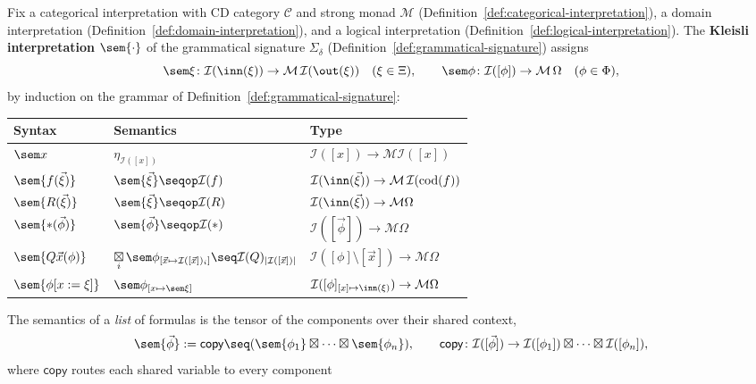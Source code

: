 \begin{definition}
\label{def:kleisli-interpretation}
\leanok
Fix a categorical interpretation with CD category $\mathcal C$ and
strong monad $\mathcal M$ (Definition~\ref{def:categorical-interpretation}),
a domain interpretation (Definition~\ref{def:domain-interpretation}),
and a logical interpretation (Definition~\ref{def:logical-interpretation}).
The \textbf{Kleisli interpretation} $\sem{\cdot}$ of the grammatical
signature $\Sigma_\delta$ (Definition~\ref{def:grammatical-signature})
assigns
\[
  \sem\xi \colon \mathcal I(\inn(\xi)) \to \mathcal M\,\mathcal I(\out(\xi))
  \quad (\xi \in \Xi), \qquad
  \sem\phi \colon \mathcal I([\phi]) \to \mathcal M\,\Omega \quad (\phi \in \Phi),
\]
by induction on the grammar of Definition~\ref{def:grammatical-signature}:
\begin{center}
\begin{tabular}{lll}
\hline
\textbf{Syntax} & \textbf{Semantics} & \textbf{Type} \\
\hline
$\sem x$ & $\eta_{\mathcal I([x])}$ & $\mathcal I([x]) \to \mathcal M\mathcal I([x])$ \\
$\sem{f(\vec\xi)}$ & $\sem{\vec\xi} \seqop \mathcal I(f)$ & $\mathcal I(\inn(\vec\xi)) \to \mathcal M\,\mathcal I(\mathrm{cod}(f))$ \\
$\sem{R(\vec\xi)}$ & $\sem{\vec\xi} \seqop \mathcal I(R)$ & $\mathcal I(\inn(\vec\xi)) \to \mathcal M\Omega$ \\
$\sem{*(\vec\phi)}$ & $\sem{\vec\phi} \seqop \mathcal I(*)$ & $\mathcal I([\vec\phi]) \to \mathcal M\Omega$ \\
$\sem{Q\vec x(\phi)}$ & $\mathop{\boxtimes}\limits_i \sem\phi_{[\vec x\mapsto\mathcal I([\vec x])_i]} \seq \mathcal I(Q)_{|\mathcal I([\vec x])|}$ & $\mathcal I([\phi]\setminus[\vec x]) \to \mathcal M\Omega$ \\
$\sem{\phi[x:=\xi]}$ & $\sem\phi_{[x\mapsto\sem\xi]}$ & $\mathcal I([\phi]_{[x]\mapsto\inn(\xi)}) \to \mathcal M\Omega$ \\
\hline
\end{tabular}
\end{center}
The semantics of a \emph{list} of formulas is the tensor of
the components over their shared context,
\[
  \sem{\vec\phi} := \mathsf{copy} \seq (\sem{\phi_1} \boxtimes \cdots
  \boxtimes \sem{\phi_n}), \qquad
  \mathsf{copy} \colon \mathcal I([\vec\phi]) \to \mathcal I([\phi_1])
  \boxtimes \cdots \boxtimes \mathcal I([\phi_n]),
\]
where $\mathsf{copy}$ routes each shared variable to every component

\end{definition}
